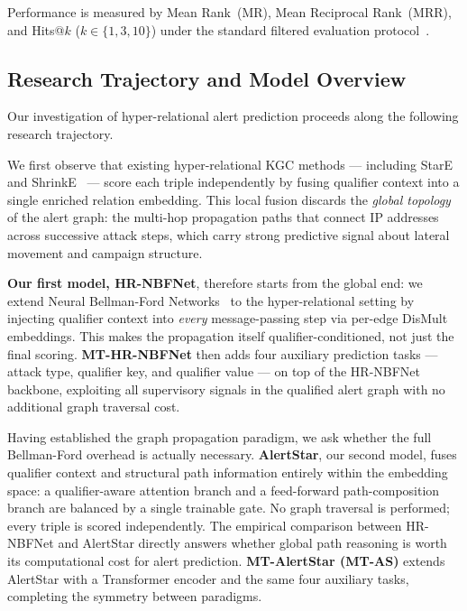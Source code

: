 \documentclass[10pt,journal,compsoc]{IEEEtran}
\begin{document}
Performance is measured by Mean Rank~(MR), Mean Reciprocal
Rank~(MRR), and Hits@$k$ ($k \in \{1,3,10\}$) under the
standard filtered evaluation protocol~\cite{bordes2013translating}.

\subsection{Research Trajectory and Model Overview}
\label{ssec:overview}

Our investigation of hyper-relational alert prediction
proceeds along the following research trajectory.

We first observe that existing hyper-relational KGC methods
— including StarE~\cite{galkin2020message} and
ShrinkE~\cite{xiong2022shrinking} — score each triple
independently by fusing qualifier context into a single
enriched relation embedding.
This local fusion discards the \emph{global topology} of
the alert graph: the multi-hop propagation paths that
connect IP addresses across successive attack steps,
which carry strong predictive signal about lateral movement
and campaign structure.

\textbf{Our first model, HR-NBFNet}, therefore starts from
the global end: we extend Neural Bellman-Ford
Networks~\cite{zhu2021neural} to the hyper-relational
setting by injecting qualifier context into \emph{every}
message-passing step via per-edge DisMult embeddings.
This makes the propagation itself qualifier-conditioned,
not just the final scoring.
\textbf{MT-HR-NBFNet} then adds four auxiliary prediction
tasks — attack type, qualifier key, and qualifier value —
on top of the HR-NBFNet backbone, exploiting all
supervisory signals in the qualified alert graph with no
additional graph traversal cost.

Having established the graph propagation paradigm, we ask
whether the full Bellman-Ford overhead is actually
necessary.
\textbf{AlertStar}, our second model, fuses qualifier
context and structural path information entirely within
the embedding space: a qualifier-aware attention branch
and a feed-forward path-composition branch are balanced
by a single trainable gate.
No graph traversal is performed; every triple is scored
independently.
The empirical comparison between HR-NBFNet and AlertStar
directly answers whether global path reasoning is
worth its computational cost for alert prediction.
\textbf{MT-AlertStar (MT-AS)} extends AlertStar with a
Transformer encoder and the same four auxiliary tasks,
completing the symmetry between paradigms.
\end{document}
